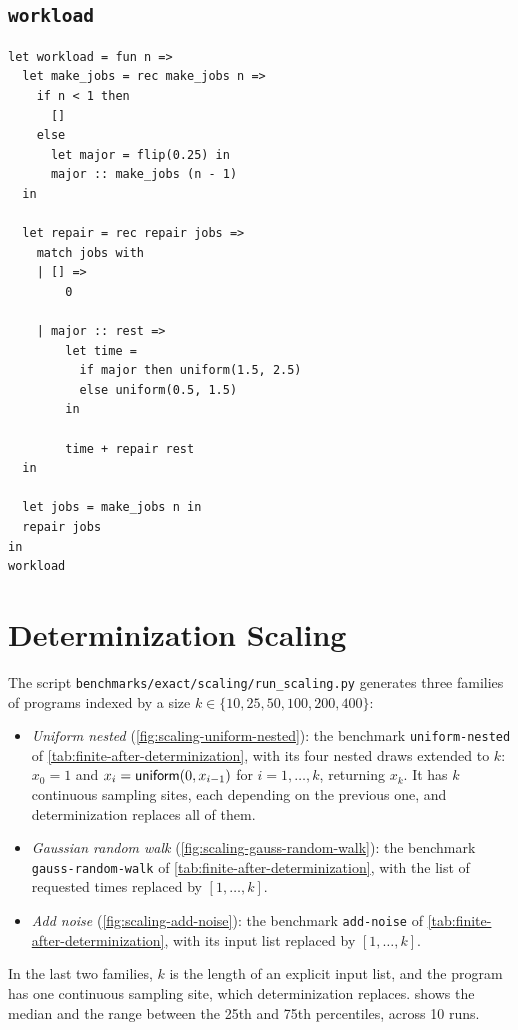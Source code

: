 \subsection{\texttt{workload}}

\begin{lstlisting}[breaklines=true]
let workload = fun n =>
  let make_jobs = rec make_jobs n =>
    if n < 1 then
      []
    else
      let major = flip(0.25) in
      major :: make_jobs (n - 1)
  in

  let repair = rec repair jobs =>
    match jobs with
    | [] =>
        0

    | major :: rest =>
        let time =
          if major then uniform(1.5, 2.5)
          else uniform(0.5, 1.5)
        in

        time + repair rest
  in

  let jobs = make_jobs n in
  repair jobs
in
workload
\end{lstlisting}

\section{Determinization Scaling}
\label{sec:appendix-scaling}

The script \texttt{benchmarks/exact/scaling/run\_scaling.py} generates three families of
programs indexed by a size $k\in\{10,25,50,100,200,400\}$:
\begin{itemize}
\item \emph{Uniform nested} (\cref{fig:scaling-uniform-nested}): the benchmark
  \texttt{uniform-nested} of \cref{tab:finite-after-determinization}, with its four nested draws
  extended to $k$: $x_0=1$ and $x_i=\mathsf{uniform}(0,x_{i-1})$ for $i=1,\ldots,k$, returning
  $x_k$. It has $k$ continuous sampling sites, each depending on the previous one, and
  determinization replaces all of them.
\item \emph{Gaussian random walk} (\cref{fig:scaling-gauss-random-walk}): the benchmark
  \texttt{gauss-random-walk} of \cref{tab:finite-after-determinization}, with the list of
  requested times replaced by $[1,\ldots,k]$.
\item \emph{Add noise} (\cref{fig:scaling-add-noise}): the benchmark \texttt{add-noise} of
  \cref{tab:finite-after-determinization}, with its input list replaced by $[1,\ldots,k]$.
\end{itemize}
In the last two families, $k$ is the length of an explicit input list, and the program has one
continuous sampling site, which determinization replaces.  shows the median and the range between the 25th and
75th percentiles, across 10 runs. 

